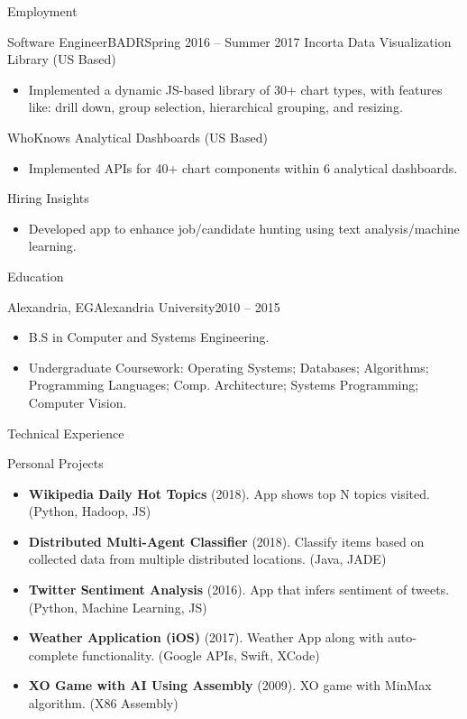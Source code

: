 \documentclass[]{ahmedamrcv}
\begin{document}
\begin{cvsection}{Employment}
		\begin{cvsubsection}{Software Engineer}{BADR}{Spring 2016 -- Summer 2017}
            Incorta Data Visualization Library (US Based)		
			\begin{itemize}
				\item Implemented a dynamic JS-based library of 30+ chart types, with features like: drill down, group selection, hierarchical grouping, and resizing.
			\end{itemize}
			WhoKnows Analytical Dashboards (US Based)
			\begin{itemize}
				\item Implemented APIs for 40+ chart components within 6 analytical dashboards.
			\end{itemize}
			Hiring Insights
			\begin{itemize}
				\item Developed app to enhance job/candidate hunting using text analysis/machine learning.
			\end{itemize}
		\end{cvsubsection}
	\end{cvsection}
	
	\begin{cvsection}{Education}
		\begin{cvsubsection}{Alexandria, EG}{Alexandria University}{2010 -- 2015}
			\begin{itemize}
				\item B.S in Computer and Systems Engineering.
				\item Undergraduate Coursework: Operating Systems; Databases; Algorithms; Programming Languages; Comp. Architecture; Systems Programming; Computer Vision.
			\end{itemize}
		\end{cvsubsection}
	\end{cvsection}
	
	\begin{cvsection}{Technical Experience}
		\begin{cvsubsection}{Personal Projects}{}{}
			\begin{itemize}
    			\item \textbf{Wikipedia Daily Hot Topics} (2018). App shows top N topics visited. (Python, Hadoop, JS)
				\item \textbf{Distributed Multi-Agent Classifier} (2018). Classify items based on collected data from multiple distributed locations. (Java, JADE)
				\item \textbf{Twitter Sentiment Analysis} (2016). App that infers sentiment of tweets. (Python, Machine Learning, JS)
				\item \textbf{Weather Application (iOS)} (2017). Weather App along with auto-complete functionality. (Google APIs, Swift, XCode)
				\item \textbf{XO Game with AI Using Assembly } (2009). XO game with MinMax algorithm. (X86 Assembly)
			\end{itemize}
		\end{cvsubsection}
	\end{cvsection}
	
\end{document}
